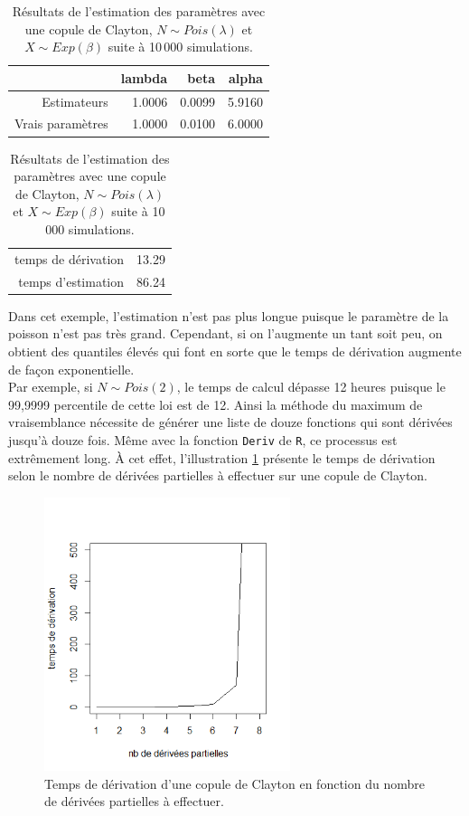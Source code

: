 \documentclass{article}
\begin{document}
		\begin{table}[H]
			\centering
			\begin{tabular}{rrrr}
				\hline
				& lambda & beta & alpha \\ 
				\hline
				Estimateurs & 1.0006 & 0.0099 & 5.9160 \\ 
				Vrais paramètres & 1.0000 & 0.0100 & 6.0000 \\ 
				\hline
			\end{tabular}
		\begin{tabular}{rr}
			\hline
			&  \\ 
			\hline
			temps de dérivation & 13.29 \\ 
			temps d'estimation & 86.24 \\ 
			\hline
		\end{tabular}
			\caption[Estimations avec une copule de Clayton et $N\sim Poisson$]{Résultats de l'estimation des paramètres avec une copule de Clayton, $N\sim Pois(\lambda)$ et $X \sim Exp(\beta)$ suite à 10\,000 simulations.}\label{tbl_Clayton_Poisson}
		\end{table}
	
		Dans cet exemple, l'estimation n'est pas plus longue puisque le paramètre de la poisson n'est pas très grand. Cependant, si on l'augmente un tant soit peu, on obtient des quantiles élevés qui font en sorte que le temps de dérivation augmente de façon exponentielle.\\
	
		Par exemple, si $N \sim Pois(2)$, le temps de calcul dépasse 12 heures puisque le 99,9999 percentile de cette loi est de 12. Ainsi la méthode du maximum de vraisemblance nécessite de générer une liste de douze fonctions qui sont dérivées jusqu'à douze fois. Même avec la fonction \texttt{Deriv} de \texttt{R}, ce processus est extrêmement long. À cet effet, l'illustration \ref{graph_temps_deriv} présente le temps de dérivation selon le nombre de dérivées partielles à effectuer sur une copule de Clayton.
		
		\begin{figure}[H]
			\centering
			\includegraphics[height=8cm]{Graph/graph_temps_deriv.png}
			\caption{Temps de dérivation d'une copule de Clayton en fonction du nombre de dérivées partielles à effectuer.}
			\label{graph_temps_deriv}
		\end{figure}
		
\end{document}
